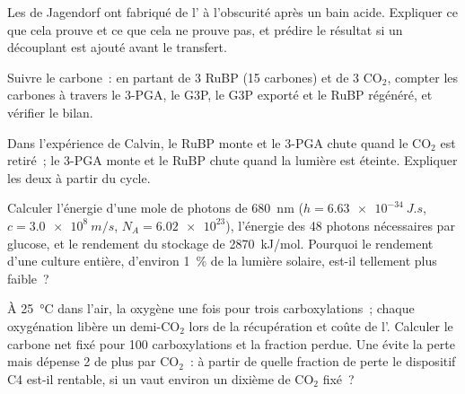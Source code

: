 \begin{exercise}[$\star\star$]\label{exo:b1:photosynthesis:7}
Les  de Jagendorf ont fabriqué de l' à l'obscurité après
un bain acide. Expliquer ce que cela prouve et ce que cela ne prouve
pas, et prédire le résultat si un découplant est ajouté avant le
transfert.
\end{exercise}

\begin{exercise}[$\star\star$]\label{exo:b1:photosynthesis:8}
Suivre le carbone~: en partant de 3 RuBP (15 carbones) et de 3
$\mathrm{CO_2}$, compter les carbones à travers le 3-PGA, le G3P, le G3P
exporté et le RuBP régénéré, et vérifier le bilan.
\end{exercise}

\begin{exercise}[$\star\star$]\label{exo:b1:photosynthesis:9}
Dans l'expérience de Calvin, le RuBP monte et le 3-PGA chute quand le
$\mathrm{CO_2}$ est retiré~; le 3-PGA monte et le RuBP chute quand la
lumière est éteinte. Expliquer les deux à partir du cycle.
\end{exercise}

\begin{exercise}[$\star\star\star$]\label{exo:b1:photosynthesis:10}
Calculer l'énergie d'une mole de photons de \qty{680}{nm} ($h =
\qty{6.63e-34}{J.s}$, $c = \qty{3.0e8}{m/s}$, $N_A = \num{6.02e23}$),
l'énergie des 48 photons nécessaires par glucose, et le rendement du
stockage de \qty{2870}{kJ/mol}. Pourquoi le rendement d'une culture
entière, d'environ \qty{1}{\%} de la lumière solaire, est-il tellement
plus faible~?
\end{exercise}

\begin{exercise}[$\star\star\star$]\label{exo:b1:photosynthesis:11}
À \qty{25}{\celsius} dans l'air, la  oxygène une fois pour trois
carboxylations~; chaque oxygénation libère un demi-$\mathrm{CO_2}$ lors
de la récupération et coûte de l'. Calculer le carbone net fixé pour
100 carboxylations et la fraction perdue. Une  évite la
perte mais dépense 2  de plus par $\mathrm{CO_2}$~: à partir de
quelle fraction de perte le dispositif C4 est-il rentable, si un 
vaut environ un dixième de $\mathrm{CO_2}$ fixé~?
\end{exercise}

